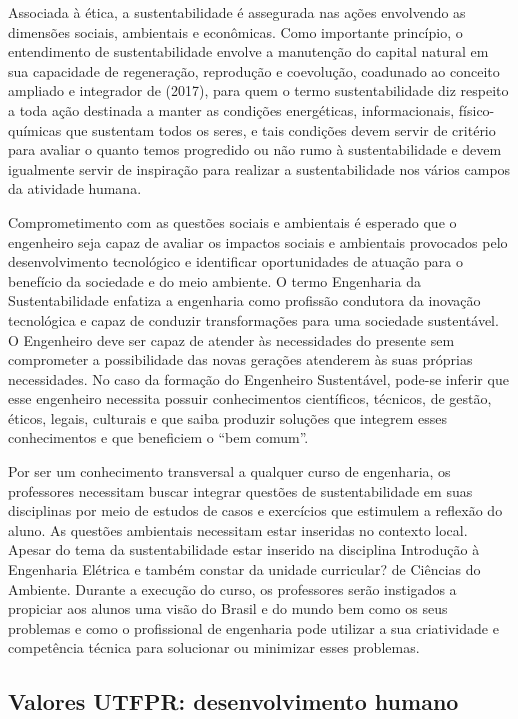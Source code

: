Associada à ética, a sustentabilidade é assegurada nas ações envolvendo as dimensões sociais, ambientais e econômicas. Como importante princípio, o entendimento de sustentabilidade envolve a manutenção do capital natural em sua capacidade de regeneração, reprodução e coevolução, coadunado ao conceito ampliado e integrador de  (2017), para quem o termo sustentabilidade diz respeito a toda ação destinada a manter as condições energéticas, informacionais, físico-químicas que sustentam todos os seres, e tais condições devem servir de critério para avaliar o quanto temos progredido ou não rumo à sustentabilidade e devem igualmente servir de inspiração para realizar a sustentabilidade nos vários campos da atividade humana.

Comprometimento com as questões sociais e ambientais é esperado que o engenheiro seja capaz de avaliar os impactos sociais e ambientais provocados pelo desenvolvimento tecnológico e identificar oportunidades de atuação para o benefício da sociedade e do meio ambiente. O termo Engenharia da Sustentabilidade enfatiza a engenharia como profissão condutora da inovação tecnológica e capaz de conduzir transformações para uma sociedade sustentável. O Engenheiro deve ser capaz de atender às necessidades do presente sem comprometer a possibilidade das novas gerações atenderem às suas próprias necessidades. No caso da formação do Engenheiro Sustentável, pode-se inferir que esse engenheiro necessita possuir conhecimentos científicos, técnicos, de gestão, éticos, legais, culturais e que saiba produzir soluções que integrem esses conhecimentos e que beneficiem o ``bem comum''. 

Por ser um conhecimento transversal a qualquer curso de engenharia, os professores necessitam buscar integrar questões de sustentabilidade em suas disciplinas por meio de estudos de casos e exercícios que estimulem a reflexão do aluno. As questões ambientais necessitam estar inseridas no contexto local.  Apesar do tema da sustentabilidade estar inserido na disciplina Introdução à Engenharia Elétrica e também constar da unidade curricular? de Ciências do Ambiente. Durante a execução do curso, os professores serão instigados a propiciar aos alunos uma visão do Brasil e do mundo bem como os seus problemas e como o profissional de engenharia pode utilizar a sua criatividade e competência técnica para solucionar ou minimizar esses problemas.

\subsection{Valores UTFPR: desenvolvimento humano}

